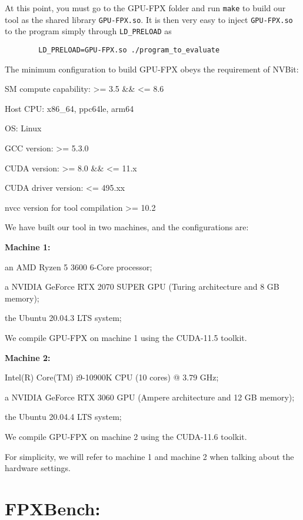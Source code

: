 \documentclass{article}
\begin{document}
	At this point, you must go to the GPU-FPX folder and run {\tt make} to build our tool as the shared library {\tt GPU-FPX.so}.
	It is then very easy to inject  {\tt GPU-FPX.so} to the program simply through {\tt LD\_PRELOAD} as
	\begin{verbatim}
		LD_PRELOAD=GPU-FPX.so ./program_to_evaluate
	\end{verbatim}
	The minimum configuration to build GPU-FPX obeys the requirement of NVBit: 
	\begin{compactitem}
		\item SM compute capability: >= 3.5 \&\& <= 8.6
		\item Host CPU: x86\_64, ppc64le, arm64
		\item OS: Linux
		\item GCC version: >= 5.3.0
		\item CUDA version: >= 8.0 \&\& <= 11.x
		\item CUDA driver version: <= 495.xx
		\item nvcc version for tool compilation >= 10.2
	\end{compactitem}
	
	We have built our tool in two machines, and the configurations are:
	
	\textbf{Machine 1: }
	\begin{compactenum}
		\item an AMD Ryzen 5 3600 6-Core processor;
		\item a NVIDIA GeForce RTX 2070 SUPER GPU (Turing architecture and 8 GB memory);
		\item the Ubuntu 20.04.3 LTS system;
	\end{compactenum}
	We compile GPU-FPX on machine 1 using the CUDA-11.5 toolkit. 
	
	\textbf{Machine 2: }
	\begin{compactenum}
		\item Intel(R) Core(TM) i9-10900K CPU (10 cores) @ 3.79 GHz;
		\item a NVIDIA GeForce RTX 3060 GPU (Ampere architecture and 12 GB memory);
		\item the Ubuntu 20.04.4 LTS system;
	\end{compactenum}
	We compile GPU-FPX on machine 2 using the CUDA-11.6 toolkit. 
	
	
	For simplicity, we will refer to machine 1 and machine 2 when talking about the hardware settings. 
	\section{FPXBench: }
\end{document}
